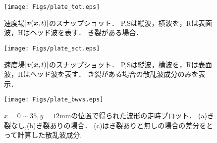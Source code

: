\begin{figure}[h]
	\begin{center}
	\texttt{[image: Figs/plate\_tot.eps]} 
	\end{center}
	\caption{
		速度場$|\mbox{\boldmath $v$}(\mbox{\boldmath $x$},t)|$のスナップショット．
		P,Sは縦波，横波を，Rは表面波，Hはヘッド波を表す．
		き裂がある場合．
	} 
	\label{fig:fig3_2}
\end{figure}
\begin{figure}[h]
	\begin{center}
	\texttt{[image: Figs/plate\_sct.eps]} 
	\end{center}
	\caption{
		速度場$|\mbox{\boldmath $v$}(\mbox{\boldmath $x$},t)|$のスナップショット．
		P,Sは縦波，横波を，Rは表面波，Hはヘッド波を表す．
		き裂がある場合の散乱波成分のみを表示．
	} 
	\label{fig:fig3_3}
\end{figure}
\begin{figure}[h]
	\begin{center}
	\texttt{[image: Figs/plate\_bwvs.eps]} 
	\end{center}
	\caption{
		$x=0\sim35, y=12$mmの位置で得られた波形の走時プロット．
		(a)き裂なし,(b)き裂ありの場合．
		(c)はき裂ありと無しの場合の差分をとって計算した散乱波成分.
	} 
	\label{fig:fig3_4}
\end{figure}
